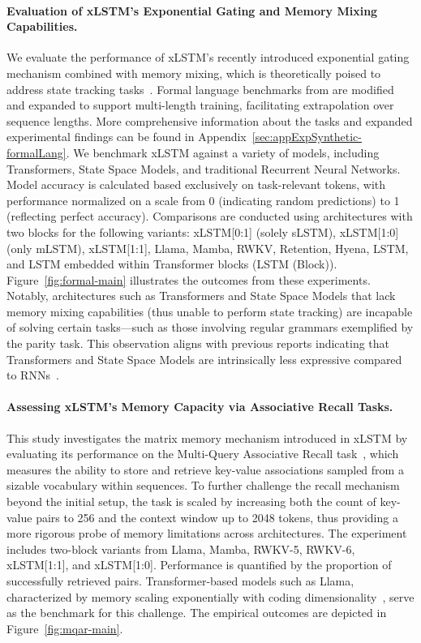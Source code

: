 \paragraph{Evaluation of xLSTM's Exponential Gating and Memory Mixing Capabilities.} We evaluate the performance of xLSTM's recently introduced exponential gating mechanism combined with memory mixing, which is theoretically poised to address state tracking tasks~\citep{Merrill:24, Merrill:23}. Formal language benchmarks from \citet{Deletang:23} are modified and expanded to support multi-length training, facilitating extrapolation over sequence lengths. More comprehensive information about the tasks and expanded experimental findings can be found in Appendix~\ref{sec:appExpSynthetic-formalLang}. We benchmark xLSTM against a variety of models, including Transformers, State Space Models, and traditional Recurrent Neural Networks. Model accuracy is calculated based exclusively on task-relevant tokens, with performance normalized on a scale from 0 (indicating random predictions) to 1 (reflecting perfect accuracy). Comparisons are conducted using architectures with two blocks for the following variants: xLSTM[0:1] (solely sLSTM), xLSTM[1:0] (only mLSTM), xLSTM[1:1], Llama, Mamba, RWKV, Retention, Hyena, LSTM, and LSTM embedded within Transformer blocks (LSTM (Block)). Figure~\ref{fig:formal-main} illustrates the outcomes from these experiments. Notably, architectures such as Transformers and State Space Models that lack memory mixing capabilities (thus unable to perform state tracking) are incapable of solving certain tasks—such as those involving regular grammars exemplified by the parity task. This observation aligns with previous reports indicating that Transformers and State Space Models are intrinsically less expressive compared to RNNs~\citep{Merrill:24, Merrill:23, Deletang:23}.

\paragraph{Assessing xLSTM's Memory Capacity via Associative Recall Tasks.} This study investigates the matrix memory mechanism introduced in xLSTM by evaluating its performance on the Multi-Query Associative Recall task~\citep{Arora:23arxiv}, which measures the ability to store and retrieve key-value associations sampled from a sizable vocabulary within sequences. To further challenge the recall mechanism beyond the initial setup, the task is scaled by increasing both the count of key-value pairs to 256 and the context window up to 2048 tokens, thus providing a more rigorous probe of memory limitations across architectures. The experiment includes two-block variants from Llama, Mamba, RWKV-5, RWKV-6, xLSTM[1:1], and xLSTM[1:0]. Performance is quantified by the proportion of successfully retrieved pairs. Transformer-based models such as Llama, characterized by memory scaling exponentially with coding dimensionality~\citep{Ramsauer:21}, serve as the benchmark for this challenge. The empirical outcomes are depicted in Figure~\ref{fig:mqar-main}.

